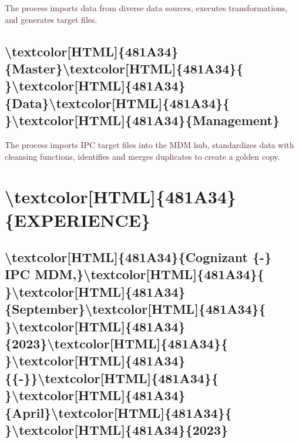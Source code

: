 \documentclass[12pt]{article}%
\begin{document}
%
\begin{justify}%
\textcolor[HTML]{481A34}{The}\textcolor[HTML]{481A34}{ }\textcolor[HTML]{481A34}{process}\textcolor[HTML]{481A34}{ }\textcolor[HTML]{481A34}{imports}\textcolor[HTML]{481A34}{ }\textcolor[HTML]{481A34}{data}\textcolor[HTML]{481A34}{ }\textcolor[HTML]{481A34}{from}\textcolor[HTML]{481A34}{ }\textcolor[HTML]{481A34}{diverse}\textcolor[HTML]{481A34}{ }\textcolor[HTML]{481A34}{data}\textcolor[HTML]{481A34}{ }\textcolor[HTML]{481A34}{sources, executes transformations, and}\textcolor[HTML]{481A34}{ }\textcolor[HTML]{481A34}{generates}\textcolor[HTML]{481A34}{ }\textcolor[HTML]{481A34}{target}\textcolor[HTML]{481A34}{ }\textcolor[HTML]{481A34}{files.}%
\end{justify}%
\newline%
%
\subsection{\textbackslash{}textcolor{[}HTML{]}\{481A34\}\{Master\}\textbackslash{}textcolor{[}HTML{]}\{481A34\}\{ \}\textbackslash{}textcolor{[}HTML{]}\{481A34\}\{Data\}\textbackslash{}textcolor{[}HTML{]}\{481A34\}\{ \}\textbackslash{}textcolor{[}HTML{]}\{481A34\}\{Management\}}%
\label{subsec:subsec38}%

%
\begin{justify}%
\textcolor[HTML]{481A34}{The process imports IPC target files into the}\textcolor[HTML]{481A34}{ }\textcolor[HTML]{481A34}{MDM hub, }\textcolor[HTML]{481A34}{standardizes data with cleansing}\textcolor[HTML]{481A34}{ }\textcolor[HTML]{481A34}{functions, identifies}\textcolor[HTML]{481A34}{ }\textcolor[HTML]{481A34}{and}\textcolor[HTML]{481A34}{ }\textcolor[HTML]{481A34}{merges}\textcolor[HTML]{481A34}{ }\textcolor[HTML]{481A34}{duplicates to}\textcolor[HTML]{481A34}{ }\textcolor[HTML]{481A34}{create}\textcolor[HTML]{481A34}{ }\textcolor[HTML]{481A34}{a}\textcolor[HTML]{481A34}{ }\textcolor[HTML]{481A34}{golden}\textcolor[HTML]{481A34}{ }\textcolor[HTML]{481A34}{copy.}%
\end{justify}%
\newline%
%
\section{\textbackslash{}textcolor{[}HTML{]}\{481A34\}\{EXPERIENCE\}}%
\label{sec:sec41}%

%
\subsection{\textbackslash{}textcolor{[}HTML{]}\{481A34\}\{Cognizant \{{-}\} IPC MDM,\}\textbackslash{}textcolor{[}HTML{]}\{481A34\}\{ \}\textbackslash{}textcolor{[}HTML{]}\{481A34\}\{September\}\textbackslash{}textcolor{[}HTML{]}\{481A34\}\{ \}\textbackslash{}textcolor{[}HTML{]}\{481A34\}\{2023\}\textbackslash{}textcolor{[}HTML{]}\{481A34\}\{ \}\textbackslash{}textcolor{[}HTML{]}\{481A34\}\{\{{-}\}\}\textbackslash{}textcolor{[}HTML{]}\{481A34\}\{ \}\textbackslash{}textcolor{[}HTML{]}\{481A34\}\{April\}\textbackslash{}textcolor{[}HTML{]}\{481A34\}\{ \}\textbackslash{}textcolor{[}HTML{]}\{481A34\}\{2023\}}%
\label{subsec:subsec42}%
\end{document}
